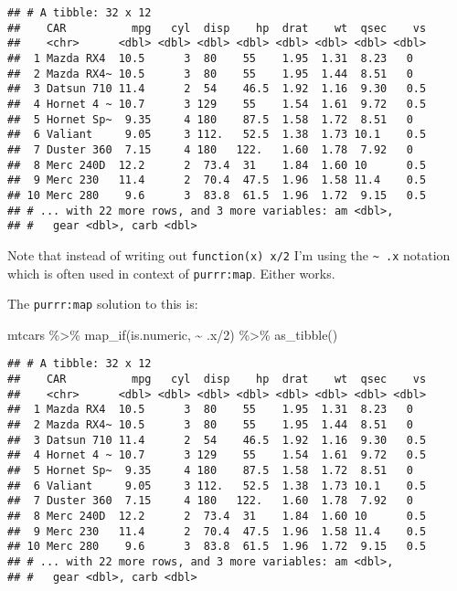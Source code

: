 \documentclass[
]{book}
\newenvironment{Shaded}{\begin{snugshade}}{\end{snugshade}}
\newcommand{\DecValTok}[1]{\textcolor[rgb]{0.00,0.00,0.81}{#1}}
\newcommand{\FunctionTok}[1]{\textcolor[rgb]{0.00,0.00,0.00}{#1}}
\newcommand{\NormalTok}[1]{#1}
\newcommand{\SpecialCharTok}[1]{\textcolor[rgb]{0.00,0.00,0.00}{#1}}
\begin{document}
\begin{verbatim}
## # A tibble: 32 x 12
##    CAR          mpg   cyl  disp    hp  drat    wt  qsec    vs
##    <chr>      <dbl> <dbl> <dbl> <dbl> <dbl> <dbl> <dbl> <dbl>
##  1 Mazda RX4  10.5      3  80    55    1.95  1.31  8.23   0  
##  2 Mazda RX4~ 10.5      3  80    55    1.95  1.44  8.51   0  
##  3 Datsun 710 11.4      2  54    46.5  1.92  1.16  9.30   0.5
##  4 Hornet 4 ~ 10.7      3 129    55    1.54  1.61  9.72   0.5
##  5 Hornet Sp~  9.35     4 180    87.5  1.58  1.72  8.51   0  
##  6 Valiant     9.05     3 112.   52.5  1.38  1.73 10.1    0.5
##  7 Duster 360  7.15     4 180   122.   1.60  1.78  7.92   0  
##  8 Merc 240D  12.2      2  73.4  31    1.84  1.60 10      0.5
##  9 Merc 230   11.4      2  70.4  47.5  1.96  1.58 11.4    0.5
## 10 Merc 280    9.6      3  83.8  61.5  1.96  1.72  9.15   0.5
## # ... with 22 more rows, and 3 more variables: am <dbl>,
## #   gear <dbl>, carb <dbl>
\end{verbatim}

Note that instead of writing out \texttt{function(x)\ x/2} I'm using the \texttt{\textasciitilde{}\ .x} notation which is often used in context of \texttt{purrr:map}. Either works.

The \texttt{purrr:map} solution to this is:

\begin{Shaded}
\begin{Highlighting}[]
\NormalTok{mtcars }\SpecialCharTok{\%\textgreater{}\%} \FunctionTok{map\_if}\NormalTok{(is.numeric, }\SpecialCharTok{\textasciitilde{}}\NormalTok{ .x}\SpecialCharTok{/}\DecValTok{2}\NormalTok{) }\SpecialCharTok{\%\textgreater{}\%} \FunctionTok{as\_tibble}\NormalTok{()}
\end{Highlighting}
\end{Shaded}

\begin{verbatim}
## # A tibble: 32 x 12
##    CAR          mpg   cyl  disp    hp  drat    wt  qsec    vs
##    <chr>      <dbl> <dbl> <dbl> <dbl> <dbl> <dbl> <dbl> <dbl>
##  1 Mazda RX4  10.5      3  80    55    1.95  1.31  8.23   0  
##  2 Mazda RX4~ 10.5      3  80    55    1.95  1.44  8.51   0  
##  3 Datsun 710 11.4      2  54    46.5  1.92  1.16  9.30   0.5
##  4 Hornet 4 ~ 10.7      3 129    55    1.54  1.61  9.72   0.5
##  5 Hornet Sp~  9.35     4 180    87.5  1.58  1.72  8.51   0  
##  6 Valiant     9.05     3 112.   52.5  1.38  1.73 10.1    0.5
##  7 Duster 360  7.15     4 180   122.   1.60  1.78  7.92   0  
##  8 Merc 240D  12.2      2  73.4  31    1.84  1.60 10      0.5
##  9 Merc 230   11.4      2  70.4  47.5  1.96  1.58 11.4    0.5
## 10 Merc 280    9.6      3  83.8  61.5  1.96  1.72  9.15   0.5
## # ... with 22 more rows, and 3 more variables: am <dbl>,
## #   gear <dbl>, carb <dbl>
\end{verbatim}
\end{document}
